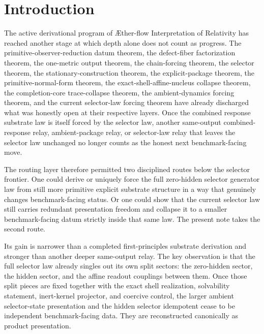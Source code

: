 \documentclass[11pt]{article}
\newcommand{\Aflow}{\AE{}ther-flow}
\newcommand{\TheoryName}{\Aflow{} Interpretation of Relativity}
\begin{document}
\section{Introduction}

The active derivational program of \TheoryName{} has reached another stage at which depth alone does not count as progress. The primitive-observer-reduction datum theorem, the defect-fiber factorization theorem, the one-metric output theorem, the chain-forcing theorem, the selector theorem, the stationary-construction theorem, the explicit-package theorem, the primitive-normal-form theorem, the exact-shell-affine-nucleus collapse theorem, the completion-core trace-collapse theorem, the ambient-dynamics forcing theorem, and the current selector-law forcing theorem have already discharged what was honestly open at their respective layers. Once the combined response substrate law is itself forced by the selector law, another same-output combined-response relay, ambient-package relay, or selector-law relay that leaves the selector law unchanged no longer counts as the honest next benchmark-facing move.

The routing layer therefore permitted two disciplined routes below the selector frontier. One could derive or uniquely force the full zero-hidden selector generator law from still more primitive explicit substrate structure in a way that genuinely changes benchmark-facing status. Or one could show that the current selector law still carries redundant presentation freedom and collapse it to a smaller benchmark-facing datum strictly inside that same law. The present note takes the second route.

Its gain is narrower than a completed first-principles substrate derivation and stronger than another deeper same-output relay. The key observation is that the full selector law already singles out its own split sectors: the zero-hidden sector, the hidden sector, and the affine readout couplings between them. Once those split pieces are fixed together with the exact shell realization, solvability statement, inert-kernel projector, and coercive control, the larger ambient selector-state presentation and the hidden selector idempotent cease to be independent benchmark-facing data. They are reconstructed canonically as product presentation.
\end{document}
